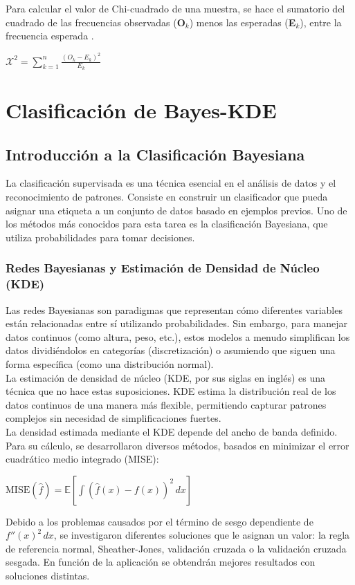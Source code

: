 Para calcular el valor de Chi-cuadrado de una muestra, se hace el sumatorio del cuadrado de las frecuencias observadas (\textbf{O$_{k}$}) menos las esperadas (\textbf{E$_{k}$}), entre la frecuencia esperada \cite{saldana2011prueba}.
\begin{center}
	$\mathcal{X}^{2} = \sum_{k=1}^{n}\frac{(O_{k}-E_{k})^{2}}{E_{k}}$
\end{center}

\chapter{Clasificación de Bayes-KDE}
 
\section{Introducción a la Clasificación Bayesiana}

La clasificación supervisada es una técnica esencial en el análisis de datos y el reconocimiento de patrones. Consiste en construir un clasificador que pueda asignar una etiqueta a un conjunto de datos basado en ejemplos previos. Uno de los métodos más conocidos para esta tarea es la clasificación Bayesiana, que utiliza probabilidades para tomar decisiones. \cite{Bayesian22:online}

\subsection{Redes Bayesianas y Estimación de Densidad de Núcleo (KDE)}

Las redes Bayesianas son paradigmas que representan cómo diferentes variables están relacionadas entre sí utilizando probabilidades. Sin embargo, para manejar datos continuos (como altura, peso, etc.), estos modelos a menudo simplifican los datos dividiéndolos en categorías (discretización) o asumiendo que siguen una forma específica (como una distribución normal).\\

La estimación de densidad de núcleo (KDE, por sus siglas en inglés) es una técnica que no hace estas suposiciones. KDE estima la distribución real de los datos continuos de una manera más flexible, permitiendo capturar patrones complejos sin necesidad de simplificaciones fuertes.\\

La densidad estimada mediante el KDE depende del ancho de banda definido. Para su cálculo, se desarrollaron diversos métodos, basados en minimizar el error cuadrático medio integrado (MISE):
\begin{center}
	$\text{MISE}(\hat{f}) = \mathbb{E} \left[ \int (\hat{f}(x) - f(x))^2 \, dx \right]$
\end{center}
Debido a los problemas causados por el término de sesgo dependiente de \(f''(x)^2 \, dx\), se investigaron diferentes soluciones que le asignan un valor: la regla de referencia normal, Sheather-Jones, validación cruzada o la validación cruzada sesgada. En función de la aplicación se obtendrán mejores resultados con soluciones distintas. \cite{Kernelde33:online}

